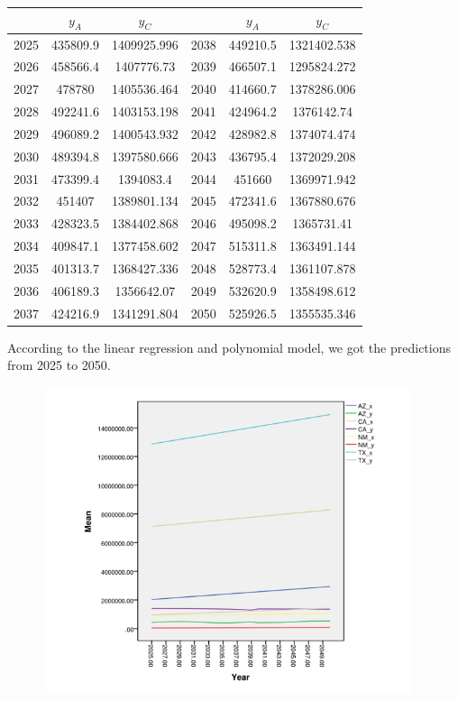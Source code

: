 \documentclass[12pt]{article}
\begin{document}
\begin{table}[!h]\centering
\begin{tabular}{|c|c|c|c|c|c| }
\hline
&$y_{A}$&	$y_{C}$&&$y_{A}$&	$y_{C}$\\
\hline
2025&	435809.9&	1409925.996&2038&	449210.5&	1321402.538\\
\hline
2026&	458566.4&	1407776.73&2039&	466507.1&	1295824.272\\
\hline
2027&	478780&	1405536.464&2040&	414660.7&	1378286.006\\
\hline
2028&	492241.6&	1403153.198&2041&	424964.2&	1376142.74\\
\hline
2029&	496089.2&	1400543.932&2042&	428982.8&	1374074.474\\
\hline
2030&	489394.8&	1397580.666&2043&	436795.4&	1372029.208\\
\hline
2031&	473399.4&	1394083.4&2044&	451660&	1369971.942\\
\hline
2032&	451407&	1389801.134&2045&	472341.6&	1367880.676\\
\hline
2033&	428323.5&	1384402.868&2046&	495098.2&	1365731.41\\
\hline
2034&	409847.1&	1377458.602&2047&	515311.8&	1363491.144\\
\hline
2035&	401313.7&	1368427.336&2048&	528773.4&	1361107.878\\
\hline
2036&	406189.3&	1356642.07&2049&	532620.9&	1358498.612\\
\hline
2037&	424216.9&	1341291.804&2050&	525926.5&	1355535.346\\
\hline
\end{tabular}
\end{table}


According to the linear regression and polynomial model, we got the predictions from 2025 to 2050.

\includegraphics[width=13cm,height=9cm]{d4.png}
\end{document}
